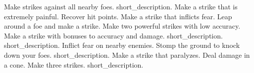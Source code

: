 \begin{spelllist}
 Make strikes against all nearby foes.
 short_description.
 Make a strike that is extremely painful.
 Recover hit points.
 Make a strike that inflicts fear.
 Leap around a foe and make a strike.
 Make two powerful strikes with low accuracy.
 Make a strike with bonuses to accuracy and damage.
 short_description.
 short_description.
 Inflict fear on nearby enemies.
 Stomp the ground to knock down your foes.
 short_description.
 Make a strike that paralyzes.
 Deal damage in a cone.
 Make three strikes.
 short_description.
\end{spelllist}



\small
